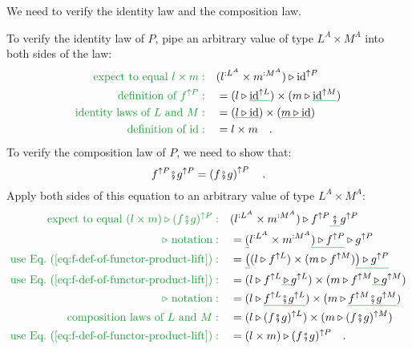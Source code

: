 We need to verify the identity law and the composition law.

To verify the identity law of $P$, pipe an arbitrary value of type
$L^{A}\times M^{A}$ into both sides of the law:
\begin{align*}
{\color{greenunder}\text{expect to equal }l\times m:}\quad & (l^{:L^{A}}\times m^{:M^{A}})\triangleright\text{id}^{\uparrow P}\\
{\color{greenunder}\text{definition of }f^{\uparrow P}:}\quad & =(l\triangleright\gunderline{\text{id}^{\uparrow L}})\times(m\triangleright\gunderline{\text{id}^{\uparrow M}})\\
{\color{greenunder}\text{identity laws of }L\text{ and }M:}\quad & =(\gunderline{l\triangleright\text{id}})\times(\gunderline{m\triangleright\text{id}})\\
{\color{greenunder}\text{definition of }\text{id}:}\quad & =l\times m\quad.
\end{align*}
To verify the composition law of $P$, we need to show that:
\[
f^{\uparrow P}\bef g^{\uparrow P}=\left(f\bef g\right)^{\uparrow P}\quad.
\]
Apply both sides of this equation to an arbitrary value of type $L^{A}\times M^{A}$:
\begin{align*}
{\color{greenunder}\text{expect to equal }(l\times m)\triangleright(f\bef g)^{\uparrow P}:}\quad & (l^{:L^{A}}\times m^{:M^{A}})\triangleright f^{\uparrow P}\gunderline{\,\bef\,}g^{\uparrow P}\\
{\color{greenunder}\triangleright\text{ notation}:}\quad & =\gunderline (l^{:L^{A}}\times m^{:M^{A}}\gunderline{)\triangleright f^{\uparrow P}}\triangleright g^{\uparrow P}\\
{\color{greenunder}\text{use Eq.~(\ref{eq:f-def-of-functor-product-lift})}:}\quad & =\gunderline{\big(}(l\triangleright f^{\uparrow L})\times(m\triangleright f^{\uparrow M})\gunderline{\big)\triangleright g^{\uparrow P}}\\
{\color{greenunder}\text{use Eq.~(\ref{eq:f-def-of-functor-product-lift})}:}\quad & =(l\triangleright f^{\uparrow L}\gunderline{\,\triangleright\,}g^{\uparrow L})\times(m\triangleright f^{\uparrow M}\gunderline{\,\triangleright\,}g^{\uparrow M})\\
{\color{greenunder}\triangleright\text{ notation}:}\quad & =(l\triangleright\gunderline{f^{\uparrow L}\bef g^{\uparrow L}})\times(m\triangleright\gunderline{f^{\uparrow M}\bef g^{\uparrow M}})\\
{\color{greenunder}\text{composition laws of }L\text{ and }M:}\quad & =(l\triangleright(f\bef g)^{\uparrow L})\times(m\triangleright(f\bef g)^{\uparrow M})\\
{\color{greenunder}\text{use Eq.~(\ref{eq:f-def-of-functor-product-lift})}:}\quad & =(l\times m)\triangleright(f\bef g)^{\uparrow P}\quad.
\end{align*}
